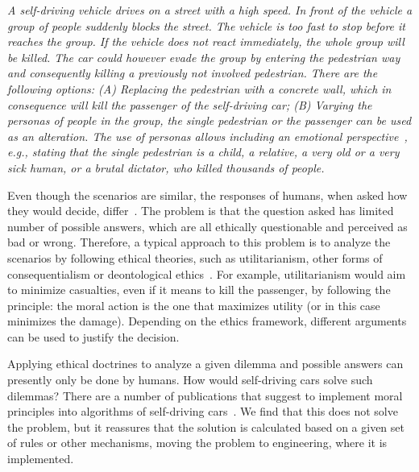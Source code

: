 \textit{
A self-driving vehicle drives on a street with a high speed. In front of the vehicle a group of people suddenly blocks the street. The vehicle is too fast to stop before it reaches the group. If the vehicle does not react immediately, the whole group will be killed. The car could however evade the group by entering the pedestrian way and consequently killing a previously not involved pedestrian. There are the following options: (A) Replacing the pedestrian with a concrete wall, which in consequence will kill the passenger of the self-driving car; (B) Varying the personas of people in the group, the single pedestrian or the passenger can be used as an alteration. The use of personas allows including an emotional perspective~\cite{BleskeRechek2010}, e.g., stating that the single pedestrian is a child, a relative, a very old or a very sick human, or a brutal dictator, who killed thousands of people.}

Even though the scenarios are similar, the responses of humans, when asked how they would decide, differ~\cite{Bonnefon2016}. The problem is that the question asked has limited number of possible answers, which are all ethically questionable and perceived as bad or wrong. Therefore, a typical approach to this problem is to analyze the scenarios by following ethical theories, such as utilitarianism, other forms of consequentialism or deontological ethics~\cite{mackinnon2012ethics}. For example, utilitarianism would aim to minimize casualties, even if it means to kill the passenger, by following the principle: the moral action is the one that maximizes utility (or in this case minimizes the damage). Depending on the ethics framework, different arguments can be used to justify the decision. 

Applying ethical doctrines to analyze a given dilemma and possible answers can presently only be done by humans. How would self-driving cars solve such dilemmas? There are a number of publications that suggest to implement moral principles into algorithms of self-driving cars~\cite{Goodall2016,DENNIS20161,Dennis2014}. We find that this does not solve the problem, but it reassures that the solution is calculated based on a given set of rules or other mechanisms, moving the problem to engineering, where it is implemented.

